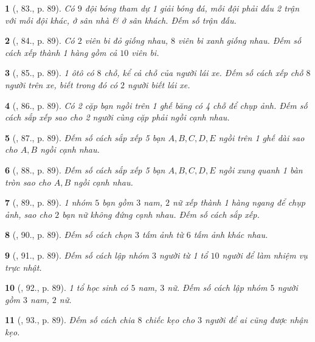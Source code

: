 \documentclass{article}
\newtheorem{baitoan}{}
\begin{document}
\begin{baitoan}[\cite{Binh_Toan_6_tap_2}, 83., p. 89]
	Có $9$ đội bóng tham dự 1 giải bóng đá, mỗi đội phải đấu 2 trận với mỗi đội khác, ở sân nhà \& ở sân khách. Đếm số trận đấu.
\end{baitoan}

\begin{baitoan}[\cite{Binh_Toan_6_tap_2}, 84., p. 89]
	Có $2$ viên bi đỏ giống nhau, $8$ viên bi xanh giống nhau. Đếm số cách xếp thành 1 hàng gồm cả $10$ viên bi.
\end{baitoan}

\begin{baitoan}[\cite{Binh_Toan_6_tap_2}, 85., p. 89]
	1 ôtô có $8$ chỗ, kể cả chỗ của người lái xe. Đếm số cách xếp chỗ $8$ người trên xe, biết trong đó có $2$ người biết lái xe.
\end{baitoan}

\begin{baitoan}[\cite{Binh_Toan_6_tap_2}, 86., p. 89]
	Có 2 cặp bạn ngồi trên 1 ghế băng có 4 chỗ để chụp ảnh. Đếm số cách sắp xếp sao cho 2 người cùng cặp phải ngồi cạnh nhau.
\end{baitoan}

\begin{baitoan}[\cite{Binh_Toan_6_tap_2}, 87., p. 89]
	Đếm số cách sắp xếp 5 bạn $A,B,C,D,E$ ngồi trên 1 ghế dài sao cho $A,B$ ngồi cạnh nhau.
\end{baitoan}

\begin{baitoan}[\cite{Binh_Toan_6_tap_2}, 88., p. 89]
	Đếm số cách sắp xếp 5 bạn $A,B,C,D,E$ ngồi xung quanh 1 bàn tròn sao cho $A,B$ ngồi cạnh nhau.
\end{baitoan}

\begin{baitoan}[\cite{Binh_Toan_6_tap_2}, 89., p. 89]
	1 nhóm $5$ bạn gồm $3$ nam, $2$ nữ xếp thành 1 hàng ngang để chụp ảnh, sao cho $2$ bạn nữ không đứng cạnh nhau. Đếm số cách sắp xếp.
\end{baitoan}

\begin{baitoan}[\cite{Binh_Toan_6_tap_2}, 90., p. 89]
	Đếm số cách chọn $3$ tấm ảnh từ $6$ tấm ảnh khác nhau.
\end{baitoan}

\begin{baitoan}[\cite{Binh_Toan_6_tap_2}, 91., p. 89]
	Đếm số cách lập nhóm $3$ người từ 1 tổ $10$ người để làm nhiệm vụ trực nhật.
\end{baitoan}

\begin{baitoan}[\cite{Binh_Toan_6_tap_2}, 92., p. 89]
	1 tổ học sinh có $5$ nam, $3$ nữ. Đếm số cách lập nhóm $5$ người gồm $3$ nam, $2$ nữ.
\end{baitoan}

\begin{baitoan}[\cite{Binh_Toan_6_tap_2}, 93., p. 89]
	Đếm số cách chia $8$ chiếc kẹo cho $3$ người để ai cũng được nhận kẹo.
\end{baitoan}


\printbibliography[heading=bibintoc]
	
\end{document}
